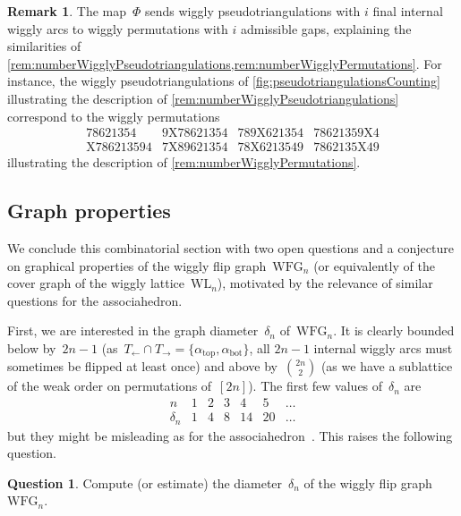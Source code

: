 \documentclass{amsart}
\theoremstyle{definition}
\newtheorem{remark}[theorem]{Remark}
\newtheorem{question}[theorem]{Question}
\newcommand{\wigglyFlipGraph}{\mathrm{WFG}} %
\newcommand{\wigglyLattice}{\mathrm{WL}} %
\begin{document}
\begin{remark}
The map~$\Phi$ sends wiggly pseudotriangulations with $i$ final internal wiggly arcs to wiggly permutations with $i$ admissible gaps, explaining the similarities of \cref{rem:numberWigglyPseudotriangulations,rem:numberWigglyPermutations}.
For instance, the wiggly pseudotriangulations of \cref{fig:pseudotriangulationsCounting} illustrating the description of \cref{rem:numberWigglyPseudotriangulations} correspond to the wiggly permutations
\[
\begin{array}{cccc}
78621354 & 9\mathrm{X}78621354 & 789\mathrm{X}621354 & 78621359\mathrm{X}4 \\
\mathrm{X}786213594 & 7\mathrm{X}89621354 & 78\mathrm{X}6213549 & 7862135\mathrm{X}49
\end{array}
\]
illustrating the description of \cref{rem:numberWigglyPermutations}.
\end{remark}


\subsection{Graph properties}
\label{subsec:graphProperties}

We conclude this combinatorial section with two open questions and a conjecture on graphical properties of the wiggly flip graph~$\wigglyFlipGraph_n$ (or equivalently of the cover graph of the wiggly lattice~$\wigglyLattice_n$), motivated by the relevance of similar questions for the associahedron.

First, we are interested in the graph diameter~$\delta_n$ of~$\wigglyFlipGraph_n$.
It is clearly bounded below by~$2n-1$ (as~$T_\leftarrow \cap T_\rightarrow = \{\alpha_\mathrm{top}, \alpha_\mathrm{bot}\}$, all $2n-1$ internal wiggly arcs must sometimes be flipped at least once) and above by~$\binom{2n}{2}$ (as we have a sublattice of the weak order on permutations of~$[2n]$).
The first few values of~$\delta_n$ are
\[
\begin{array}{c|ccccccccc}
n & 1 & 2 & 3 & 4 & 5 & \dots \\
\hline
\delta_n & 1 & 4 & 8 & 14 & 20 & \dots
\end{array}
\]
but they might be misleading as for the associahedron~\cite{Pournin}.
This raises the following question.

\begin{question}
Compute (or estimate) the diameter~$\delta_n$ of the wiggly flip graph~$\wigglyFlipGraph_n$.
\end{question}
\end{document}
